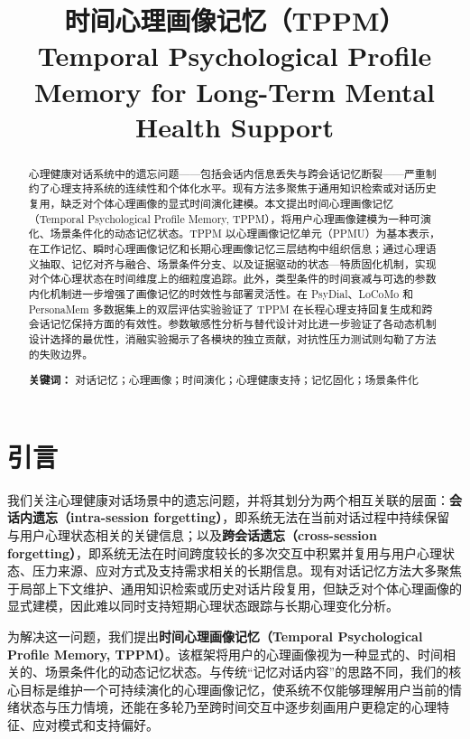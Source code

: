 \documentclass[12pt,a4paper]{article}
\title{\textbf{时间心理画像记忆（TPPM）}\\[4pt]
       \large Temporal Psychological Profile Memory for Long-Term Mental Health Support}
\author{}
\date{}
\newcommand{\methodname}{\textsc{TPPM}}
\begin{document}
\maketitle

\begin{abstract}
\noindent 心理健康对话系统中的遗忘问题——包括会话内信息丢失与跨会话记忆断裂——严重制约了心理支持系统的连续性和个体化水平。现有方法多聚焦于通用知识检索或对话历史复用，缺乏对个体心理画像的显式时间演化建模。本文提出时间心理画像记忆（Temporal Psychological Profile Memory, TPPM），将用户心理画像建模为一种可演化、场景条件化的动态记忆状态。TPPM 以心理画像记忆单元（PPMU）为基本表示，在工作记忆、瞬时心理画像记忆和长期心理画像记忆三层结构中组织信息；通过心理语义抽取、记忆对齐与融合、场景条件分支、以及证据驱动的状态—特质固化机制，实现对个体心理状态在时间维度上的细粒度追踪。此外，类型条件的时间衰减与可选的参数内化机制进一步增强了画像记忆的时效性与部署灵活性。在 PsyDial、LoCoMo 和 PersonaMem 多数据集上的双层评估实验验证了 TPPM 在长程心理支持回复生成和跨会话记忆保持方面的有效性。参数敏感性分析与替代设计对比进一步验证了各动态机制设计选择的最优性，消融实验揭示了各模块的独立贡献，对抗性压力测试则勾勒了方法的失败边界。

\vspace{6pt}
\noindent\textbf{关键词：} 对话记忆；心理画像；时间演化；心理健康支持；记忆固化；场景条件化
\end{abstract}

\vspace{10pt}

\section{引言}

我们关注心理健康对话场景中的遗忘问题，并将其划分为两个相互关联的层面：\textbf{会话内遗忘（intra-session forgetting）}，即系统无法在当前对话过程中持续保留与用户心理状态相关的关键信息；以及\textbf{跨会话遗忘（cross-session forgetting）}，即系统无法在时间跨度较长的多次交互中积累并复用与用户心理状态、压力来源、应对方式及支持需求相关的长期信息。现有对话记忆方法大多聚焦于局部上下文维护、通用知识检索或历史对话片段复用，但缺乏对个体心理画像的显式建模，因此难以同时支持短期心理状态跟踪与长期心理变化分析。

为解决这一问题，我们提出\textbf{时间心理画像记忆（Temporal Psychological Profile Memory, \methodname{}）}。该框架将用户的心理画像视为一种显式的、时间相关的、场景条件化的动态记忆状态。与传统``记忆对话内容''的思路不同，我们的核心目标是维护一个可持续演化的心理画像记忆，使系统不仅能够理解用户当前的情绪状态与压力情境，还能在多轮乃至跨时间交互中逐步刻画用户更稳定的心理特征、应对模式和支持偏好。
\end{document}
